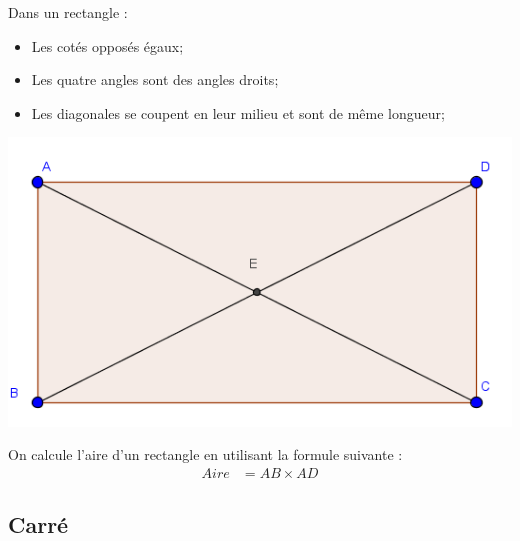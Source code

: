 \documentclass[12pt,a4paper]{article}
\begin{document}
\begin{myprops}
	
	\begin{multicols}{2}
		
		Dans un rectangle :
		\begin{itemize}
			\item Les cotés opposés égaux;
			\item Les quatre angles sont des angles droits;
			\item Les diagonales se coupent en leur milieu et sont de même longueur;
			
		\end{itemize}
		
		
		\includegraphics[scale=0.5]{./img/rect}
	\end{multicols}

\end{myprops}

\begin{mymeth}
		On calcule l'aire d'un rectangle en utilisant la formule suivante :
		\vspace*{-1cm}
		\begin{align*}
		Aire &= AB \times AD
		\end{align*}
\end{mymeth}

\subsection{Carré}
\end{document}
